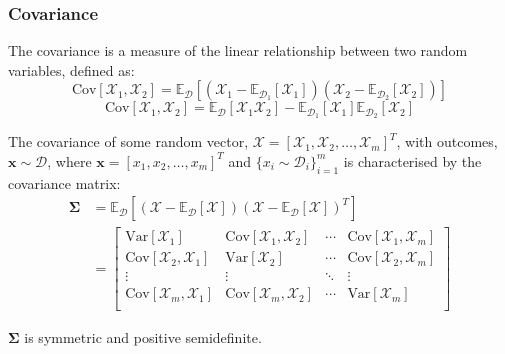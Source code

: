 \subsubsection{Covariance}
\begin{definition}[Covariance]
The covariance is a measure of the linear relationship between two random
variables, defined as:
\[\mbox{Cov}[\mathcal{X}_1, \mathcal{X}_2] = \mathbb{E}_{\mathcal{D}}\left[
(\mathcal{X}_1 - \mathbb{E}_{\mathcal{D}_1}[\mathcal{X}_1]) (\mathcal{X}_2 -
\mathbb{E}_{\mathcal{D}_2}[\mathcal{X}_2]) \right]\]
\[\mbox{Cov}[\mathcal{X}_1, \mathcal{X}_2] =
\mathbb{E}_{\mathcal{D}}\left[\mathcal{X}_1 \mathcal{X}_2 \right] -
\mathbb{E}_{\mathcal{D}_1}\left[\mathcal{X}_1 \right]
\mathbb{E}_{\mathcal{D}_2}\left[\mathcal{X}_2 \right]\]
\end{definition}
The covariance of some random vector, $\boldsymbol{\mathcal{X}} =
{[\mathcal{X}_1, \mathcal{X}_2,\ldots,\mathcal{X}_m]}^T$, with outcomes,
$\mathbf{x} \sim \mathcal{D}$, where $\mathbf{x} = {[x_1, x_2,\ldots, x_m]}^T$ and
${\{ x_i \sim \mathcal{D}_i \}}_{i=1}^m$ is characterised by the covariance
matrix:
\begin{align*}
\boldsymbol{\Sigma} &= \mathbb{E}_{\mathcal{D}} \left[ (\boldsymbol{\mathcal{X}} - \mathbb{E}_{\mathcal{D}}[\boldsymbol{\mathcal{X}}]){(\boldsymbol{\mathcal{X}} - \mathbb{E}_{\mathcal{D}}[\boldsymbol{\mathcal{X}}])}^T \right] \\
    &=\begin{bmatrix}
    \mbox{Var}[\mathcal{X}_{1}] & \mbox{Cov}[\mathcal{X}_{1},\mathcal{X}_{2}] & \cdots & \mbox{Cov}[\mathcal{X}_{1},\mathcal{X}_{m}]\\
    \mbox{Cov}[\mathcal{X}_{2},\mathcal{X}_{1}] & \mbox{Var}[\mathcal{X}_{2}] & \cdots & \mbox{Cov}[\mathcal{X}_{2},\mathcal{X}_{m}]\\
    \vdots & \vdots & \ddots & \vdots \\
    \mbox{Cov}[\mathcal{X}_{m},\mathcal{X}_{1}] & \mbox{Cov}[\mathcal{X}_{m},\mathcal{X}_{2}] & \cdots & \mbox{Var}[\mathcal{X}_{m}]\\
    \end{bmatrix}
\end{align*}
\begin{remark}
 $\boldsymbol{\Sigma}$ is symmetric and positive semidefinite.
\end{remark}
